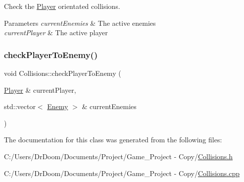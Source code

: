 Check the \hyperlink{class_player}{Player} orientated collisions. 


\begin{DoxyParams}{Parameters}
{\em current\+Enemies} & The active enemies \\
\hline
{\em current\+Player} & The active player \\
\hline
\end{DoxyParams}
\mbox{\label{class_collisions_a5c4cd9f8f690d0ba92fe5aabfb8d88fa}} 
\subsubsection{\texorpdfstring{check\+Player\+To\+Enemy()}{checkPlayerToEnemy()}}
{\footnotesize\ttfamily void Collisions\+::check\+Player\+To\+Enemy (\begin{DoxyParamCaption}\item[{\hyperlink{class_player}{Player} \&}]{current\+Player,  }\item[{std\+::vector$<$ \hyperlink{class_enemy}{Enemy} $>$ \&}]{current\+Enemies }\end{DoxyParamCaption})\hspace{0.3cm}{\ttfamily [private]}}



The documentation for this class was generated from the following files\+:\begin{DoxyCompactItemize}
\item 
C\+:/\+Users/\+Dr\+Doom/\+Documents/\+Project/\+Game\+\_\+\+Project -\/ Copy/\hyperlink{_collisions_8h}{Collisions.\+h}\item 
C\+:/\+Users/\+Dr\+Doom/\+Documents/\+Project/\+Game\+\_\+\+Project -\/ Copy/\hyperlink{_collisions_8cpp}{Collisions.\+cpp}\end{DoxyCompactItemize}
